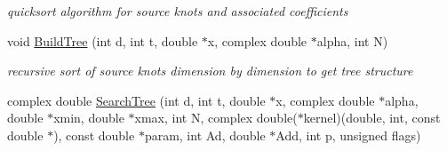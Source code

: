 \begin{CompactItemize}
\begin{CompactList}\small\item\em quicksort algorithm for source knots and associated coefficients \item\end{CompactList}\item 
\hypertarget{group__applications__fastsum_ga11}{
void \hyperlink{group__applications__fastsum_ga11}{Build\-Tree} (int d, int t, double $\ast$x, complex double $\ast$alpha, int N)}
\label{group__applications__fastsum_ga11}

\begin{CompactList}\small\item\em recursive sort of source knots dimension by dimension to get tree structure \item\end{CompactList}\item 
\hypertarget{group__applications__fastsum_ga12}{
complex double \hyperlink{group__applications__fastsum_ga12}{Search\-Tree} (int d, int t, double $\ast$x, complex double $\ast$alpha, double $\ast$xmin, double $\ast$xmax, int N, complex double($\ast$kernel)(double, int, const double $\ast$), const double $\ast$param, int Ad, double $\ast$Add, int p, unsigned flags)}
\label{group__applications__fastsum_ga12}


\end{CompactItemize}
